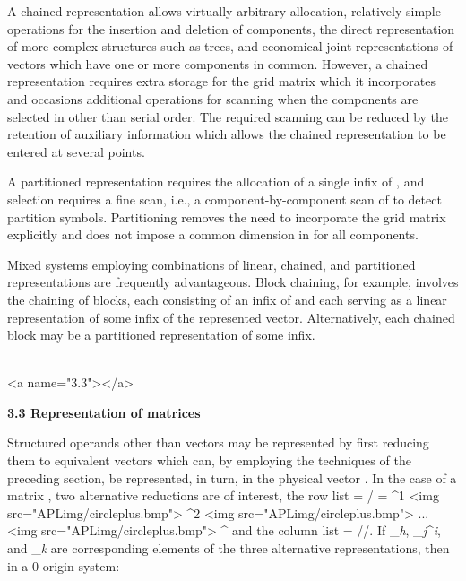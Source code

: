 {\par A chained representation allows virtually arbitrary allocation, relatively simple operations for the insertion and deletion of components, the direct representation of more complex structures such as trees, and economical joint representations of vectors which have one or more components in common. However, a chained representation requires extra storage for the grid matrix which it incorporates and occasions additional operations for scanning when the components are selected in other than serial order. The required scanning can be reduced by the retention of auxiliary information which allows the chained representation to be entered at several points.

\par A partitioned representation requires the allocation of a single infix of \textbf{\pi}, and selection requires a fine scan, i.e., a component-by-component scan of \textbf{\pi} to detect partition symbols. Partitioning removes the need to incorporate the grid matrix explicitly and does not impose a common dimension in \textbf{\pi} for all components.

\par Mixed systems employing combinations of linear, chained, and partitioned representations are frequently advantageous. Block chaining, for example, involves the chaining of blocks, each consisting of an infix of \textbf{\pi} and each serving as a linear representation of some infix of the represented vector. Alternatively, each chained block may be a partitioned representation of some infix.
\\\ 



<a name="3.3"></a>
\par \textbf{3.3 Representation of matrices}

\par Structured operands other than vectors may be represented by first reducing them to equivalent vectors which can, by employing the techniques of the preceding section, be represented, in turn, in the physical vector \textbf{\pi}. In the case of a matrix , two alternative reductions are of interest, the row list 
 = / = ^{1} <img src="APLimg/circleplus.bmp"> 
^{2} <img src="APLimg/circleplus.bmp"> ...
<img src="APLimg/circleplus.bmp"> ^{\textit{\mu}} and the column list  = //. If _{\textit{h}}, 
_{\textit{j}}^{\textit{i}}, and _{\textit{k}} are corresponding elements of the three alternative representations, then in a 0-origin system:

}
